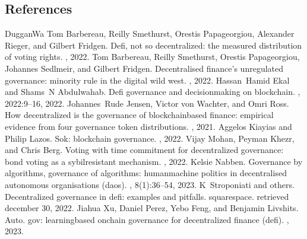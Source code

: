 \documentclass[letterpaper,10pt,english]{jupyterBook}
\begin{document}
\subsection{References}
\label{\detokenize{SBT/SBT:references}}
\begin{sphinxthebibliography}{DugganWa}
\sphinxAtStartPar
Tom Barbereau, Reilly Smethurst, Orestis Papageorgiou, Alexander Rieger, and Gilbert Fridgen. Defi, not so decentralized: the measured distribution of voting rights. , 2022.
\sphinxAtStartPar
Tom Barbereau, Reilly Smethurst, Orestis Papageorgiou, Johannes Sedlmeir, and Gilbert Fridgen. Decentralised finance's unregulated governance: minority rule in the digital wild west. , 2022.
\sphinxAtStartPar
Hassan Hamid Ekal and Shams N Abdul\sphinxhyphen{}wahab. Defi governance and decision\sphinxhyphen{}making on blockchain. , 2022:9–16, 2022.
\sphinxAtStartPar
Johannes Rude Jensen, Victor von Wachter, and Omri Ross. How decentralized is the governance of blockchain\sphinxhyphen{}based finance: empirical evidence from four governance token distributions. , 2021.
\sphinxAtStartPar
Aggelos Kiayias and Philip Lazos. Sok: blockchain governance. , 2022.
\sphinxAtStartPar
Vijay Mohan, Peyman Khezr, and Chris Berg. Voting with time commitment for decentralized governance: bond voting as a sybil\sphinxhyphen{}resistant mechanism. , 2022.
\sphinxAtStartPar
Kelsie Nabben. Governance by algorithms, governance of algorithms: human\sphinxhyphen{}machine politics in decentralised autonomous organisations (daos). , 8(1):36–54, 2023.
\sphinxAtStartPar
K Stroponiati and others. Decentralized governance in defi: examples and pitfalls. squarespace. retrieved december 30, 2022.
\sphinxAtStartPar
Jiahua Xu, Daniel Perez, Yebo Feng, and Benjamin Livshits. Auto. gov: learning\sphinxhyphen{}based on\sphinxhyphen{}chain governance for decentralized finance (defi). , 2023.

\end{sphinxthebibliography}
\end{document}
